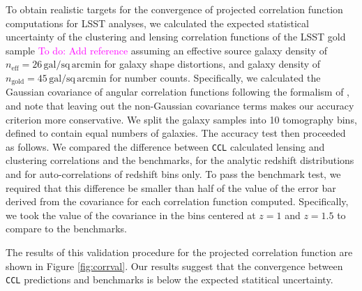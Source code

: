 \documentclass[\docopts]{\docclass}
\newcommand{\todo}[1]{\textcolor{magenta}{To do: #1}}
\newcommand{\ccl}{{\tt CCL}\xspace}
\begin{document}
To obtain realistic targets for the convergence of projected correlation function computations for LSST analyses, we calculated the expected statistical uncertainty of the clustering and lensing correlation functions of the LSST gold sample \todo{Add reference} assuming an effective source galaxy density of $n_\mathrm{eff} = 26\,\mathrm{gal/sq\,arcmin}$ for galaxy shape distortions, and galaxy density of $n_\mathrm{gold} = 45\,\mathrm{gal/sq\,arcmin}$ for number counts. Specifically, we calculated the Gaussian covariance of angular correlation functions following the formalism of \citet{2008A&A...477...43J}, and note that leaving out the non-Gaussian covariance terms makes our accuracy criterion more conservative. We split the galaxy samples into 10 tomography bins, defined to contain equal numbers of galaxies. The accuracy test then proceeded as follows. We compared the difference between \ccl calculated lensing and clustering correlations and the benchmarks, for the analytic redshift distributions and for auto-correlations of redshift bins only. To pass the benchmark test, we required that this difference be smaller than half of the value of the error bar derived from the covariance for each correlation function computed. Specifically, we took the value of the covariance in the bins centered at $z=1$ and $z=1.5$ to compare to the benchmarks.

The results of this validation procedure for the projected correlation function are shown in Figure \ref{fig:corrval}. Our results suggest that the convergence between \ccl predictions and benchmarks is below the expected statitical uncertainty. 
\end{document}
